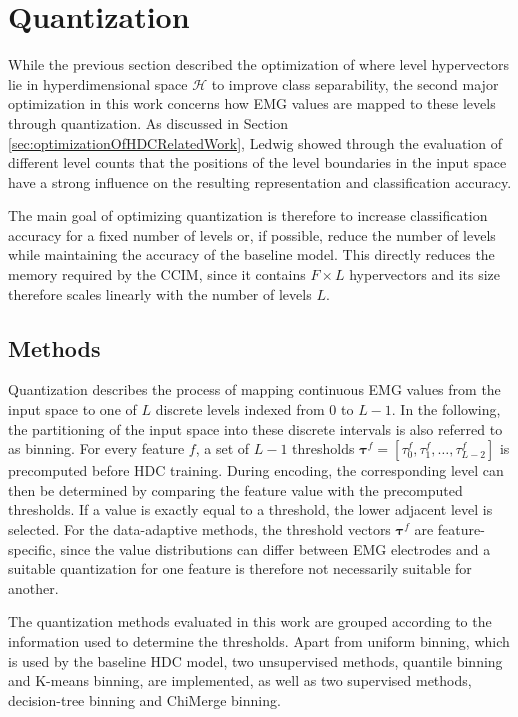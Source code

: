 \section{Quantization}
\label{sec:quantization}
While the previous section described the optimization of where level hypervectors lie in hyperdimensional space $\mathcal{H}$ to improve class separability, the second major optimization in this work concerns how EMG values are mapped to these levels through quantization. As discussed in Section \ref{sec:optimizationOfHDCRelatedWork}, Ledwig \cite{ledwig_vdl-implementierung_2025} showed through the evaluation of different level counts that the positions of the level boundaries in the input space have a strong influence on the resulting representation and classification accuracy. 

The main goal of optimizing quantization is therefore to increase classification accuracy for a fixed number of levels or, if possible, reduce the number of levels while maintaining the accuracy of the baseline model. This directly reduces the memory required by the \ac{CCIM}, since it contains $F\times L$ hypervectors and its size therefore scales linearly with the number of levels $L$.
    \subsection{Methods}
    Quantization describes the process of mapping continuous EMG values from the input space to one of $L$ discrete levels indexed from $0$ to $L-1$. In the following, the partitioning of the input space into these discrete intervals is also referred to as binning. For every feature $f$, a set of $L-1$ thresholds $\boldsymbol{\tau}^f =[\tau^f_0,\tau^f_1,\ldots,\tau^f_{L-2}]$ is precomputed before HDC training. During encoding, the corresponding level can then be determined by comparing the feature value with the precomputed thresholds. If a value is exactly equal to a threshold, the lower adjacent level is selected. For the data-adaptive methods, the threshold vectors $\boldsymbol{\tau}^f$ are feature-specific, since the value distributions can differ between EMG electrodes and a suitable quantization for one feature is therefore not necessarily suitable for another. 

    The quantization methods evaluated in this work are grouped according to the information used to determine the thresholds. Apart from uniform binning, which is used by the baseline HDC model, two unsupervised methods, quantile binning and K-means binning, are implemented, as well as two supervised methods, decision-tree binning and ChiMerge binning.


